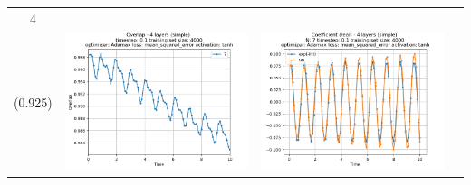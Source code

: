 \documentclass{article}
\begin{document}
\begin{tabular}{|c|c|c|c|}
     4 \\ (0.925) &
     \includegraphics[scale=0.37]{./4_layers_simple_train_samples=4000_timestep=0.1_t_total=10.0_optimizer=Adamax_loss=mean_squared_error_activation=tanh/Overlap.png} &
     \includegraphics[scale=0.37]{./4_layers_simple_train_samples=4000_timestep=0.1_t_total=10.0_optimizer=Adamax_loss=mean_squared_error_activation=tanh/Coeff_N=7_(real).png} &

\end{tabular}
\end{document}
